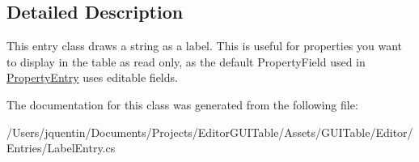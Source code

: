 \subsection{Detailed Description}
This entry class draws a string as a label. This is useful for properties you want to display in the table as read only, as the default Property\+Field used in \mbox{\hyperlink{class_g_u_i_extensions_1_1_property_entry}{Property\+Entry}} uses editable fields. 



The documentation for this class was generated from the following file\+:\begin{DoxyCompactItemize}
\item 
/\+Users/jquentin/\+Documents/\+Projects/\+Editor\+G\+U\+I\+Table/\+Assets/\+G\+U\+I\+Table/\+Editor/\+Entries/Label\+Entry.\+cs\end{DoxyCompactItemize}
